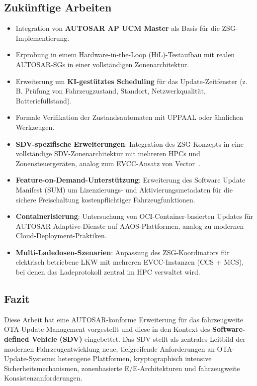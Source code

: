 ﻿\documentclass[12pt,a4paper,twoside]{article}
\begin{document}
\subsection{Zukünftige Arbeiten}

\begin{itemize}
  \item Integration von \textbf{AUTOSAR AP UCM Master} als Basis für die
    ZSG-Implementie\-rung.
  \item Erprobung in einem Hardware-in-the-Loop (HiL)-Testaufbau mit
    realen AUTOSAR-SGs in einer vollständigen Zonenarchitektur.
  \item Erweiterung um \textbf{KI-gestütztes Scheduling} für das
    Update-Zeitfenster (z.\,B. Prüfung von Fahrzeugzustand, Standort,
    Netzwerkqualität, Batteriefüllstand).
  \item Formale Verifikation der Zustandsautomaten mit UPPAAL oder
    ähnlichen Werkzeugen.
  \item \textbf{SDV-spezifische Erweiterungen}: Integration des ZSG-Konzepts
    in eine vollständige SDV-Zonenarchitektur mit mehreren HPCs und
    Zonensteuergeräten, analog zum EVCC-Ansatz von Vector~\cite{schneider2026ladekomm}.
  \item \textbf{Feature-on-Demand-Unterstützung}: Erweiterung des Software
    Update Manifest (SUM) um Lizenzierungs- und Aktivierungsmetadaten für
    die sichere Freischaltung kostenpflichtiger Fahrzeugfunktionen.
  \item \textbf{Containerisierung}: Untersuchung von OCI-Container-basierten
    Updates für AUTOSAR Adaptive-Dienste auf AAOS-Plattformen, analog zu
    modernen Cloud-Deployment-Praktiken.
  \item \textbf{Multi-Ladedosen-Szenarien}: Anpassung des ZSG-Koordinators
    für elektrisch betriebene LKW mit mehreren EVCC-Instanzen (CCS + MCS),
    bei denen das Ladeprotokoll zentral im HPC verwaltet wird.
\end{itemize}


\subsection{Fazit}
\label{sec:fazit}


Diese Arbeit hat eine AUTOSAR-konforme Erweiterung für das fahrzeugweite
OTA-Update-Management vorgestellt und diese in den Kontext des
\textbf{Software-defined Vehicle (SDV)} eingebettet. Das SDV stellt als
zentrales Leitbild der modernen Fahrzeugentwicklung neue, tiefgreifende
Anforderungen an OTA-Update-Systeme: heterogene Plattformen, kryptographisch
intensive Sicherheitsmechanismen, zonenbasierte E/E-Architekturen und
fahrzeugweite Konsistenzanforderungen.
\end{document}
